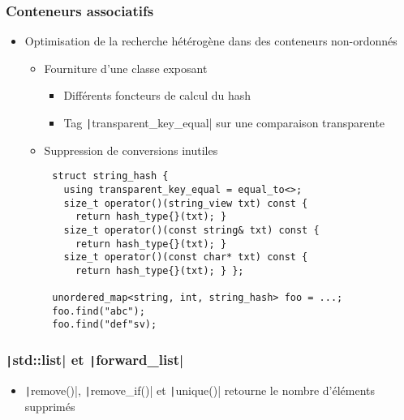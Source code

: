 \documentclass[C++.tex]{subfiles}
\begin{document}
\begin{frame}[fragile]
	\frametitle{Conteneurs associatifs}
	\begin{itemize}
		\item Optimisation de la recherche hétérogène dans des conteneurs non-ordonnés
		\begin{itemize}
			\item Fourniture d'une classe exposant
			\begin{itemize}
				\item Différents foncteurs de calcul du hash
				\item Tag \texttt|transparent_key_equal| sur une comparaison transparente


			\end{itemize}
			\item Suppression de conversions inutiles
		\end{itemize}
	\end{itemize}

	\begin{verbatim}
		struct string_hash {
		  using transparent_key_equal = equal_to<>;
		  size_t operator()(string_view txt) const { 
		    return hash_type{}(txt); }
		  size_t operator()(const string& txt) const {
		    return hash_type{}(txt); }
		  size_t operator()(const char* txt) const {
		    return hash_type{}(txt); } };

		unordered_map<string, int, string_hash> foo = ...;
		foo.find("abc");
		foo.find("def"sv);
	\end{verbatim}
\end{frame}

\begin{frame}[fragile]
	\frametitle{\texttt|std::list| et \texttt|forward_list|}
	\begin{itemize}
		\item \texttt|remove()|, \texttt|remove_if()| et \texttt|unique()| retourne le nombre d'éléments supprimés
	\end{itemize}
\end{frame}
\end{document}
